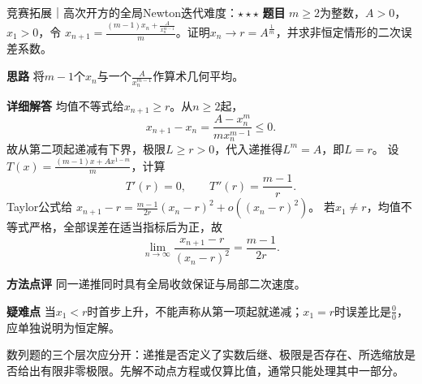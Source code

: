 \begin{example}{竞赛拓展｜高次开方的全局Newton迭代}{难度：$\star\star\star$}\label{cs:ex:newtonpower}
\textbf{题目} $m\ge2$为整数，$A>0$，$x_1>0$，令
$x_{n+1}=\frac{(m-1)x_n+\frac{A}{x_n^{m-1}}}{m}$。证明$x_n\to r=A^{\frac{1}{m}}$，并求非恒定情形的二次误差系数。
\par\textbf{思路} 将$m-1$个$x_n$与一个$\frac{A}{x_n^{m-1}}$作算术几何平均。
\par\textbf{详细解答} 均值不等式给$x_{n+1}\ge r$。从$n\ge2$起，
\[
x_{n+1}-x_n=\dfrac{A-x_n^m}{mx_n^{m-1}}\le0.
\]
故从第二项起递减有下界，极限$L\ge r>0$，代入递推得$L^m=A$，即$L=r$。
设$T(x)=\frac{(m-1)x+Ax^{1-m}}{m}$，计算
\[
T'(r)=0,\qquad T''(r)=\dfrac{m-1}{r}.
\]
Taylor公式给
$x_{n+1}-r=\frac{m-1}{2r}(x_n-r)^2+o((x_n-r)^2)$。
若$x_1\ne r$，均值不等式严格，全部误差在适当指标后为正，故
\[
\lim_{n\to\infty}\dfrac{x_{n+1}-r}{(x_n-r)^2}=\dfrac{m-1}{2r}.
\]
\par\textbf{方法点评} 同一递推同时具有全局收敛保证与局部二次速度。
\par\textbf{疑难点} 当$x_1<r$时首步上升，不能声称从第一项起就递减；$x_1=r$时误差比是$\frac{0}{0}$，应单独说明为恒定解。
\end{example}
\begin{warning}
数列题的三个层次应分开：递推是否定义了实数后继、极限是否存在、所选缩放是否给出有限非零极限。先解不动点方程或仅算比值，通常只能处理其中一部分。
\end{warning}
